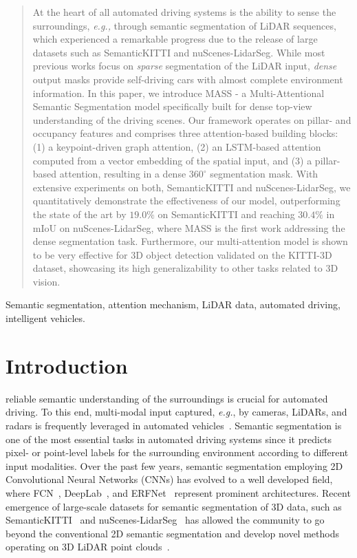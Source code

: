 \documentclass[lettersize,journal]{IEEEtran}
\begin{document}
\begin{abstract}
At the heart of all automated driving systems is the ability to sense the surroundings, \textit{e.g.,} through semantic segmentation of LiDAR sequences, which experienced a remarkable progress due to the release of large datasets such as SemanticKITTI and nuScenes-LidarSeg. While most previous works focus on \emph{sparse} segmentation of the LiDAR input, \emph{dense} output masks provide self-driving cars with almost complete environment information. In this paper, we introduce MASS - a Multi-Attentional Semantic Segmentation model specifically built for dense top-view understanding of the driving scenes. Our framework operates on pillar- and occupancy features and comprises three attention-based building blocks: (1) a keypoint-driven graph attention, (2) an LSTM-based attention computed from a vector embedding of the spatial input, and (3) a pillar-based attention, resulting in a dense $360^\circ$ segmentation mask. With extensive experiments on both, SemanticKITTI and nuScenes-LidarSeg, we quantitatively demonstrate the effectiveness of our model, outperforming the state of the art by $19.0\%$ on SemanticKITTI and reaching $30.4\%$ in mIoU on nuScenes-LidarSeg, where MASS is the first work addressing the dense segmentation task. Furthermore, our multi-attention model is shown to be very effective for 3D object detection validated on the KITTI-3D dataset, showcasing its high generalizability to other tasks related to 3D vision.
\end{abstract}
 
\begin{IEEEkeywords}
Semantic segmentation, attention mechanism, LiDAR data, automated driving, intelligent vehicles.
\end{IEEEkeywords}

\IEEEpeerreviewmaketitle

\section{Introduction}
reliable semantic understanding of the surroundings is crucial for automated driving.
To this end, multi-modal input captured, \textit{e.g.}, by cameras, LiDARs, and radars is frequently leveraged in automated vehicles~\cite{camera_lidar_integration,radar_camera,issafe}.
Semantic segmentation is one of the most essential tasks in automated driving systems since it predicts pixel- or point-level labels for the surrounding environment according to different input modalities.
Over the past few years, semantic segmentation employing 2D Convolutional Neural Networks (CNNs) has evolved to a well developed field, where FCN~\cite{fcn}, DeepLab~\cite{deeplabv2}, and ERFNet~\cite{erfnet,romera2019bridging} represent prominent architectures.
Recent emergence of large-scale datasets for semantic segmentation of 3D data, such as SemanticKITTI~\cite{semantic_kitti} and nuScenes-LidarSeg~\cite{nuscenes} has allowed the community to go beyond the conventional 2D semantic segmentation and develop novel methods operating on 3D LiDAR point clouds~\cite{gao2020we}.
\end{document}
